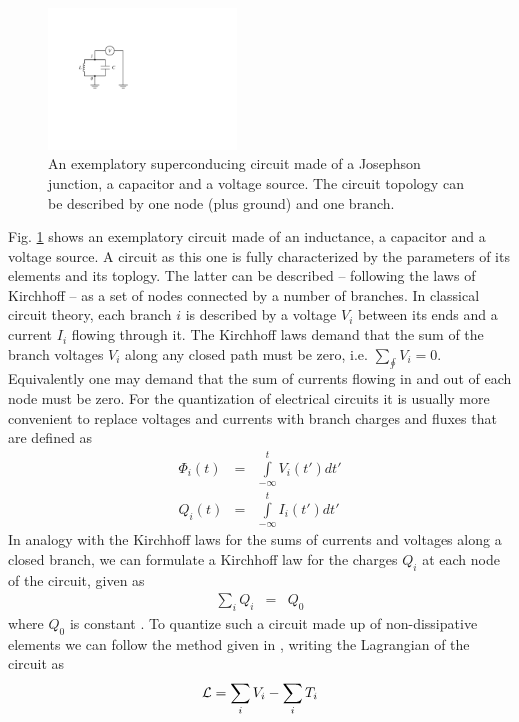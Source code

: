 \begin{figure}
	\includegraphics[width=5cm]{"./material/figures/introduction/sample_circuit"}
	\caption{An exemplatory superconducing circuit made of a Josephson junction, a capacitor and a voltage source. The circuit topology can be described by one node (plus ground) and one branch.}
	\label{fig:SampleCircuit}
\end{figure}

Fig. \ref{fig:SampleCircuit} shows an exemplatory circuit made of an inductance, a capacitor and a voltage source. A circuit as this one is fully characterized by the parameters of its elements and its toplogy. The latter can be described -- following the laws of Kirchhoff -- as a set of nodes connected by a number of branches. In classical circuit theory, each branch $i$ is described by a voltage $V_i$ between its ends and a current $I_{i}$ flowing through it. The Kirchhoff laws demand that the sum of the branch voltages $V_i$ along any closed path must be zero, i.e. $\sum\limits_{\oint} V_i = 0$. Equivalently one may demand that the sum of currents flowing in and out of each node must be zero. For the quantization of electrical circuits it is usually more convenient to replace voltages and currents with branch charges and fluxes that are defined as
%
\begin{eqnarray}
\Phi_i(t) & = & \int\limits_{-\infty}^t V_i(t') dt' \\
Q_i(t) & = & \int\limits_{-\infty}^t I_i(t') dt'
\end{eqnarray}
%
In analogy with the Kirchhoff laws for the sums of currents and voltages along a closed branch, we can formulate a Kirchhoff law for the charges $Q_i$ at each node of the circuit, given as
%
\begin{eqnarray}
\sum\limits_{i} Q_i & = & Q_0 \label{eq:kirchhoff_charge}
\end{eqnarray}
%
where $Q_0$ is constant . To quantize such a circuit made up of non-dissipative elements we can follow the method given in \cite{yurke_quantum_1984}, writing the Lagrangian of the circuit as 
%
\begin{equation}
\begin{mathcal}L\end{mathcal} = \sum\limits_i V_i - \sum\limits_i T_i
\end{equation}
